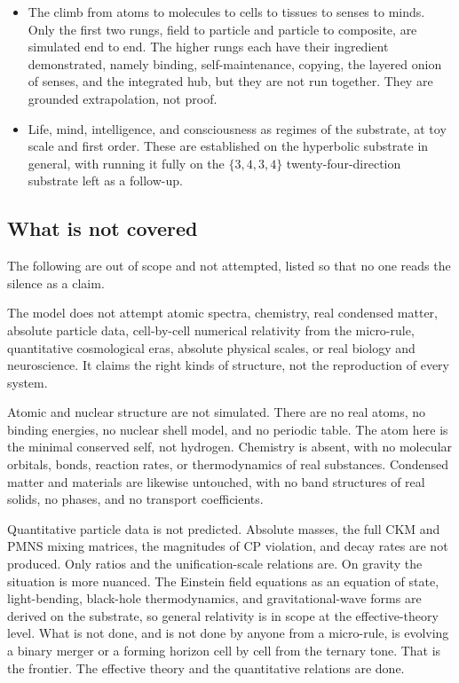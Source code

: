 \begin{itemize}
  \item The climb from atoms to molecules to cells to tissues to senses to minds. Only the first two rungs, field to particle and particle to composite, are simulated end to end. The higher rungs each have their ingredient demonstrated, namely binding, self-maintenance, copying, the layered onion of senses, and the integrated hub, but they are not run together. They are grounded extrapolation, not proof.
  \item Life, mind, intelligence, and consciousness as regimes of the substrate, at toy scale and first order. These are established on the hyperbolic substrate in general, with running it fully on the $\{3,4,3,4\}$ twenty-four-direction substrate left as a follow-up.
\end{itemize}

\subsection{What is not covered}

The following are out of scope and not attempted, listed so that no one reads the silence as a claim.

\begin{principle}
The model does not attempt atomic spectra, chemistry, real condensed matter, absolute particle data, cell-by-cell numerical relativity from the micro-rule, quantitative cosmological eras, absolute physical scales, or real biology and neuroscience. It claims the right kinds of structure, not the reproduction of every system.
\end{principle}

Atomic and nuclear structure are not simulated. There are no real atoms, no binding energies, no nuclear shell model, and no periodic table. The atom here is the minimal conserved self, not hydrogen. Chemistry is absent, with no molecular orbitals, bonds, reaction rates, or thermodynamics of real substances. Condensed matter and materials are likewise untouched, with no band structures of real solids, no phases, and no transport coefficients.

Quantitative particle data is not predicted. Absolute masses, the full CKM and PMNS mixing matrices, the magnitudes of CP violation, and decay rates are not produced. Only ratios and the unification-scale relations are. On gravity the situation is more nuanced. The Einstein field equations as an equation of state, light-bending, black-hole thermodynamics, and gravitational-wave forms are derived on the substrate, so general relativity is in scope at the effective-theory level. What is not done, and is not done by anyone from a micro-rule, is evolving a binary merger or a forming horizon cell by cell from the ternary tone. That is the frontier. The effective theory and the quantitative relations are done.

